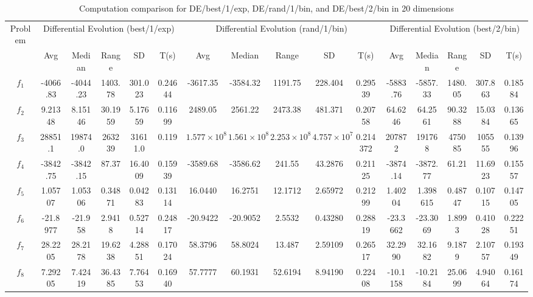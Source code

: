 \documentclass[paper=a4, fontsize=11pt]{scrartcl} %
\numberwithin{equation}{section} %
\numberwithin{figure}{section} %
\numberwithin{table}{section} %
\begin{document}
\pagebreak

\begin{landscape}
	\begin{table}
		\tiny
		\centering
		\caption{Computation comparison for DE/best/1/exp, DE/rand/1/bin, and DE/best/2/bin in 20 dimensions}
		\label{Tab1d}
		\begin{tabular}{c|ccccc|ccccc|ccccc}
			\noalign{\smallskip}\hline\noalign{\smallskip}
			Problem & \multicolumn{5}{c}{Differential Evolution (best/1/exp)}& \multicolumn{5}{|c|}{Differential Evolution (rand/1/bin)} &  \multicolumn{5}{c}{Differential Evolution (best/2/bin)} \\  
			\noalign{\smallskip}\hline\noalign{\smallskip}
			& Avg & Median & Range & SD & T(s) & Avg & Median
			& Range & SD & T(s) & Avg & Median & Range & SD &
			T(s) \\ 
			\noalign{\smallskip}\hline\noalign{\smallskip}
			$f_{1}$  & -4066.83 & -4044.23 & 1403.78 & 301.023 & 0.24644 & -3617.35 & -3584.32 & 1191.75 & 228.404 & 0.29539 & -5883.76 & -5857.33 & 1480.05 & 307.863 & 0.18584\\
			$f_{2}$  &  9.21348 &  8.15146 & 30.1959 & 5.17659 & 0.11699 &  2489.05 &  2561.22 & 2473.38 & 481.371 & 0.20758 &  64.6246 &  64.2561 & 90.3288 & 15.0384 & 0.13665\\
			$f_{3}$  &  28851.1 &  19874.0 & 263239  & 31611.0 & 0.119   &  $1.577\times 10^{8}$ & $1.561\times 10^{8}$ & $2.253\times 10^{8}$ & $4.757\times 10^{7}$ & 0.214372 & 207872 & 191768 & 475085 & 105555 & 0.13996\\
			$f_{4}$  & -3842.75 & -3842.15 & 87.37   & 16.4009 & 0.15939 & -3589.68 & -3586.62 & 241.55  & 43.2876 & 0.21125 & -3874.14 & -3872.77 & 61.21   & 11.6923 & 0.15557\\
			$f_{5}$  &  1.05707 &  1.05306 & 0.34871 & 0.04283 & 0.13114 &  16.0440 &  16.2751 & 12.1712 & 2.65972 & 0.21299 &  1.40204 & 1.398615 & 0.48747 & 0.10715 & 0.14705\\
			$f_{6}$  & -21.8977 & -21.958  & 2.9418  & 0.52714 & 0.24817 & -20.9422 & -20.9052 & 2.5532  & 0.43280 & 0.28819 & -23.3662 & -23.3069 & 1.8993  & 0.41028 & 0.22251\\
			$f_{7}$  &  28.2205 &  28.2178 & 19.6238 & 4.28851 & 0.17024 &  58.3796 &  58.8024 & 13.487  & 2.59109 & 0.26517 &  32.2990 &  32.1682 & 9.1879  & 2.10757 & 0.19349\\
			$f_{8}$  &  7.29205 &  7.42419 & 36.4385 & 7.76453 & 0.16940 &  57.7777 &  60.1931 & 52.6194 & 8.94190 & 0.22408 & -10.1158 & -10.2184 & 25.0699 & 4.94064 & 0.16174\\

\end{tabular}
\end{table}
\end{landscape}
\end{document}
